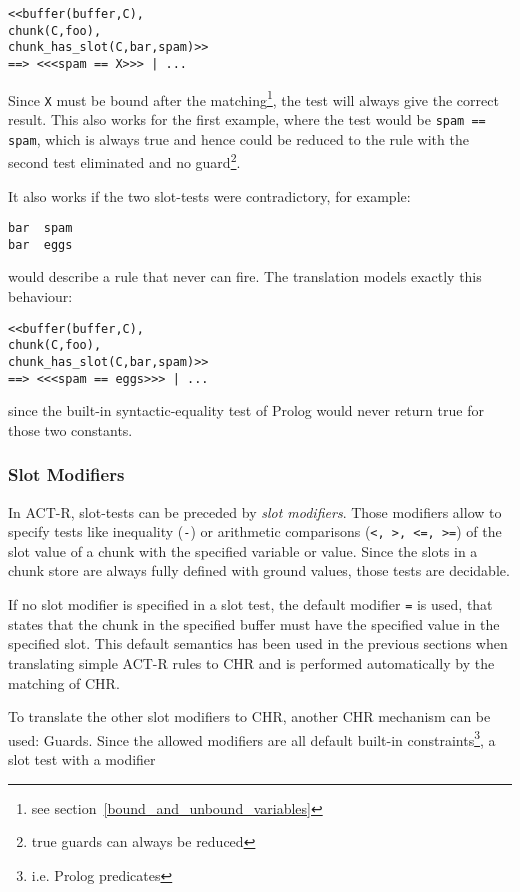 \begin{lstlisting}
<<buffer(buffer,C),
chunk(C,foo),
chunk_has_slot(C,bar,spam)>>
==> <<<spam == X>>> | ...
\end{lstlisting}

Since \lstinline|X| must be bound after the matching\footnote{see section~\ref{bound_and_unbound_variables}}, the test will always give the correct result. This also works for the first example, where the test would be \lstinline|spam == spam|, which is always true and hence could be reduced to the rule with the second test eliminated and no guard\footnote{true guards can always be reduced}.

It also works if the two slot-tests were contradictory, for example: 

\begin{lstlisting}
bar  spam
bar  eggs
\end{lstlisting}

would describe a rule that never can fire. The translation models exactly this behaviour:

\begin{lstlisting}
<<buffer(buffer,C),
chunk(C,foo),
chunk_has_slot(C,bar,spam)>>
==> <<<spam == eggs>>> | ...
\end{lstlisting}

since the built-in syntactic-equality test of Prolog would never return true for those two constants.

\subsubsection{Slot Modifiers}
\label{slot_modifiers}

In ACT-R, slot-tests can be preceded by \emph{slot modifiers}. Those modifiers allow to specify tests like inequality (\lstinline|-|) or arithmetic comparisons (\lstinline|<, >, <=, >=|) of the slot value of a chunk with the specified variable or value. Since the slots in a chunk store are always fully defined with ground values, those tests are decidable.

If no slot modifier is specified in a slot test, the default modifier \lstinline|=| is used, that states that the chunk in the specified buffer must have the specified value in the specified slot. This default semantics has been used in the previous sections when translating simple ACT-R rules to CHR and is performed automatically by the matching of CHR.

To translate the other slot modifiers to CHR, another CHR mechanism can be used: Guards. Since the allowed modifiers are all default built-in constraints\footnote{i.e. Prolog predicates}, a slot test with a modifier

